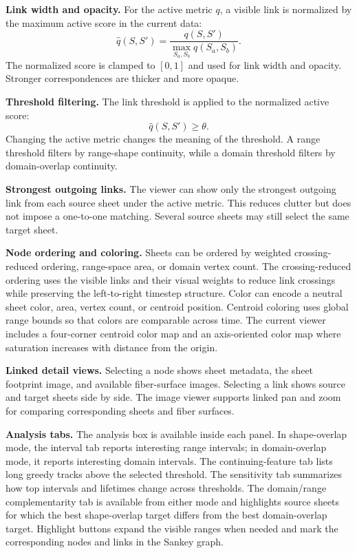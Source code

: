 \documentclass{vgtc}
\newcommand{\Sheet}{S}
\newcommand{\myparagraph}[1]{\vspace{1mm} \noindent \textbf{#1}}
\begin{document}
\myparagraph{Link width and opacity.}
For the active metric $q$, a visible link is normalized by the maximum active score in the current data:
$$
\widehat{q}(\Sheet,\Sheet')=
\frac{q(\Sheet,\Sheet')}{\max_{\Sheet_a,\Sheet_b}q(\Sheet_a,\Sheet_b)}.
$$
The normalized score is clamped to $[0,1]$ and used for link width and opacity. Stronger correspondences are thicker and more opaque.

\myparagraph{Threshold filtering.}
The link threshold is applied to the normalized active score:
$$
\widehat{q}(\Sheet,\Sheet')\geq\theta.
$$
Changing the active metric changes the meaning of the threshold. A range threshold filters by range-shape continuity, while a domain threshold filters by domain-overlap continuity.

\myparagraph{Strongest outgoing links.}
The viewer can show only the strongest outgoing link from each source sheet under the active metric. This reduces clutter but does not impose a one-to-one matching. Several source sheets may still select the same target sheet.

\myparagraph{Node ordering and coloring.}
Sheets can be ordered by weighted crossing-reduced ordering, range-space area, or domain vertex count. The crossing-reduced ordering uses the visible links and their visual weights to reduce link crossings while preserving the left-to-right timestep structure. Color can encode a neutral sheet color, area, vertex count, or centroid position. Centroid coloring uses global range bounds so that colors are comparable across time. The current viewer includes a four-corner centroid color map and an axis-oriented color map where saturation increases with distance from the origin.

\myparagraph{Linked detail views.}
Selecting a node shows sheet metadata, the sheet footprint image, and available fiber-surface images. Selecting a link shows source and target sheets side by side. The image viewer supports linked pan and zoom for comparing corresponding sheets and fiber surfaces.

\myparagraph{Analysis tabs.}
The analysis box is available inside each panel. In shape-overlap mode, the interval tab reports interesting range intervals; in domain-overlap mode, it reports interesting domain intervals. The continuing-feature tab lists long greedy tracks above the selected threshold. The sensitivity tab summarizes how top intervals and lifetimes change across thresholds. The domain/range complementarity tab is available from either mode and highlights source sheets for which the best shape-overlap target differs from the best domain-overlap target. Highlight buttons expand the visible ranges when needed and mark the corresponding nodes and links in the Sankey graph.
\end{document}
